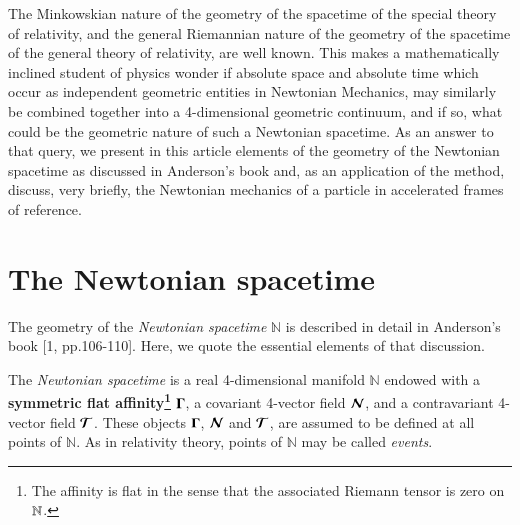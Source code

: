 The Minkowskian nature of the geometry of the spacetime of the special theory of relativity, and the general Riemannian nature of the geometry of the spacetime of the general theory of relativity, are well known. This makes a mathematically inclined student of physics  wonder if absolute space and absolute time which occur as independent geometric entities in Newtonian Mechanics, may similarly be combined together into a 4-dimensional geometric continuum, and if so, what could be the geometric nature of such a  Newtonian spacetime. As an  answer to that query, we present in this article elements of the geometry of the Newtonian spacetime as discussed in Anderson's book \cite{chap16-key1} and, as an application of the method, discuss, very briefly, the Newtonian mechanics of a particle in accelerated frames of reference.

\section{The Newtonian spacetime}\label{chap16-sec2}

The geometry of the \textsl{Newtonian spacetime} $\mathbb{N}$ is described in detail in Anderson's book [1, pp.106-110]. Here, we quote  the essential elements of that discussion.

The \textsl{Newtonian spacetime} is a real 4-dimensional manifold  $\mathbb{N}$ endowed with a \textbf{symmetric flat affinity\footnote{The affinity is flat in the sense that the associated Riemann tensor is zero on $\mathbb{N}$.}} $\mathbf{\Gamma}$, a covariant 4-vector field $\bm{\mathcal{N}}$,  and a contravariant 4-vector field  $\bm{\mathcal{T}}$. These objects $\mathbf{\Gamma}$, $\bm{\mathcal{N}}$ and $\bm{\mathcal{T}}$, are assumed to be defined   at all points of $\mathbb{N}$. As in relativity theory, points of $\mathbb{N}$ may be  called \textsl{events}. 

